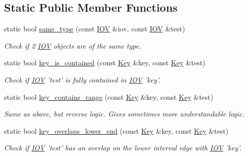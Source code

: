\subsection*{Static Public Member Functions}
\begin{DoxyCompactItemize}
\item 
static bool \hyperlink{class_d_d4hep_1_1_i_o_v_a25febeab024c770e5846197ca2a6b6fa}{same\_\-type} (const \hyperlink{class_d_d4hep_1_1_i_o_v}{IOV} \&iov, const \hyperlink{class_d_d4hep_1_1_i_o_v}{IOV} \&test)
\begin{DoxyCompactList}\small\item\em Check if 2 \hyperlink{class_d_d4hep_1_1_i_o_v}{IOV} objects are of the same type. \item\end{DoxyCompactList}\item 
static bool \hyperlink{class_d_d4hep_1_1_i_o_v_a43849b67b7823c3acd522bac26cf179d}{key\_\-is\_\-contained} (const \hyperlink{class_d_d4hep_1_1_i_o_v_a07cb46dc875296dc9cccf4ff370104ae}{Key} \&key, const \hyperlink{class_d_d4hep_1_1_i_o_v_a07cb46dc875296dc9cccf4ff370104ae}{Key} \&test)
\begin{DoxyCompactList}\small\item\em Check if \hyperlink{class_d_d4hep_1_1_i_o_v}{IOV} 'test' is fully contained in \hyperlink{class_d_d4hep_1_1_i_o_v}{IOV} 'key'. \item\end{DoxyCompactList}\item 
static bool \hyperlink{class_d_d4hep_1_1_i_o_v_abb985b984cc6eb8576a4f124de7668f5}{key\_\-contains\_\-range} (const \hyperlink{class_d_d4hep_1_1_i_o_v_a07cb46dc875296dc9cccf4ff370104ae}{Key} \&key, const \hyperlink{class_d_d4hep_1_1_i_o_v_a07cb46dc875296dc9cccf4ff370104ae}{Key} \&test)
\begin{DoxyCompactList}\small\item\em Same as above, but reverse logic. Gives sometimes more understandable logic. \item\end{DoxyCompactList}\item 
static bool \hyperlink{class_d_d4hep_1_1_i_o_v_a6354b88d28e4e57bd50a02d9d4df7653}{key\_\-overlaps\_\-lower\_\-end} (const \hyperlink{class_d_d4hep_1_1_i_o_v_a07cb46dc875296dc9cccf4ff370104ae}{Key} \&key, const \hyperlink{class_d_d4hep_1_1_i_o_v_a07cb46dc875296dc9cccf4ff370104ae}{Key} \&test)
\begin{DoxyCompactList}\small\item\em Check if \hyperlink{class_d_d4hep_1_1_i_o_v}{IOV} 'test' has an overlap on the lower interval edge with \hyperlink{class_d_d4hep_1_1_i_o_v}{IOV} 'key'. \item\end{DoxyCompactList}\item 

\end{DoxyCompactItemize}
